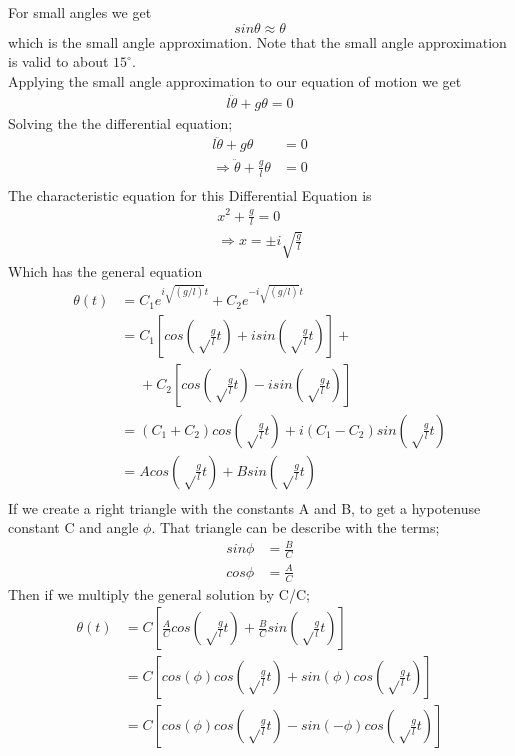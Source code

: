 \documentclass[iop]{emulateapj}
\begin{document}
\begin{figure*}
For small angles we get
\begin{equation}
\boxed{sin\theta \approx \theta}
\end{equation}
which is the small angle approximation. Note that the small angle approximation 
is valid to about $15^{\circ}$.\\
Applying the small angle approximation to our equation of motion we get
\begin{align}
\boxed{l\ddot{\theta} + g\theta = 0}
\end{align}
Solving the the differential equation;
\begin{align*}
l\ddot{\theta} + g\theta & = 0\\
\Rightarrow \ddot{\theta} + \frac{g}{l}\theta & = 0\\
\end{align*}
The characteristic equation for this Differential Equation is
\begin{align*}
x^2 + \frac{g}{l} = 0\\
\Rightarrow x = \pm i\sqrt{\frac{g}{l}}
\end{align*}
Which has the general equation
\begin{align*}
\theta(t) & = C_1e^{i\sqrt{(g/l)}t} + C_2e^{-i\sqrt{(g/l)}t}\\
& = C_1[cos(\sqrt\frac{g}{l}t) + isin(\sqrt\frac{g}{l}t)] +\\ 
&~~~~~~+ C_2[cos(\sqrt\frac{g}{l}t) - isin(\sqrt\frac{g}{l}t)]\\
& = (C_1 + C_2)cos(\sqrt\frac{g}{l}t) + i(C_1 - C_2)sin(\sqrt\frac{g}{l}t)\\
& = Acos(\sqrt\frac{g}{l}t) + Bsin(\sqrt\frac{g}{l}t)\\
\end{align*}
If we create a right triangle with the constants A and B, to get a hypotenuse
constant C and angle $\phi$. That triangle can be describe with the terms;
\begin{align*}
sin\phi & = \frac{B}{C}\\
cos\phi & = \frac{A}{C}
\end{align*}
Then if we multiply the general solution by C/C;
\begin{align*}
\theta(t) & = C[\frac{A}{C}cos(\sqrt\frac{g}{l}t) + \frac{B}{C}sin(\sqrt\frac{g}{l}t)]\\
& = C[cos(\phi) cos(\sqrt\frac{g}{l}t) + sin(\phi)cos(\sqrt\frac{g}{l}t)]\\
& = C[cos(\phi) cos(\sqrt\frac{g}{l}t) - sin(-\phi)cos(\sqrt\frac{g}{l}t)]\\

\end{align*}
\end{figure*}
\end{document}
